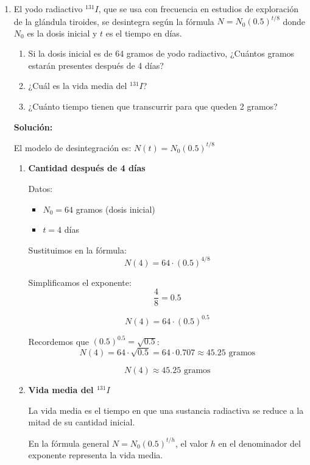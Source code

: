 \documentclass[12pt]{article}
\begin{document}
\begin{enumerate}[label=\alph*.-]
    \newpage
    
    \item El yodo radiactivo $^{131}I$, que se usa con frecuencia en estudios de exploración de la glándula tiroides, se desintegra según la fórmula $N = N_0(0.5)^{t/8}$ donde $N_0$ es la dosis inicial y $t$ es el tiempo en días.
    \begin{enumerate}[label=\roman*.]
        \item Si la dosis inicial es de 64 gramos de yodo radiactivo, ¿Cuántos gramos estarán presentes después de 4 días?
        \item ¿Cuál es la vida media del $^{131}I$?
        \item ¿Cuánto tiempo tienen que transcurrir para que queden 2 gramos?
    \end{enumerate}
    
    \textbf{Solución:}
    
    El modelo de desintegración es: $N(t) = N_0(0.5)^{t/8}$

    \begin{enumerate}[label=\roman*.]
        \item \textbf{Cantidad después de 4 días}
        
        Datos:
        \begin{itemize}
            \item $N_0 = 64$ gramos (dosis inicial)
            \item $t = 4$ días
        \end{itemize}
        
        Sustituimos en la fórmula:
        \[N(4) = 64 \cdot (0.5)^{4/8}\]
        
        Simplificamos el exponente:
        \[\frac{4}{8} = 0.5\]
        
        \[N(4) = 64 \cdot (0.5)^{0.5}\]
        
        Recordemos que $(0.5)^{0.5} = \sqrt{0.5}$:
        \[N(4) = 64 \cdot \sqrt{0.5} = 64 \cdot 0.707 \approx 45.25 \text{ gramos}\]
        
        \[\boxed{N(4) \approx 45.25 \text{ gramos}}\]
        
        \newpage
        \item \textbf{Vida media del $^{131}I$}
        
        La vida media es el tiempo en que una sustancia radiactiva se reduce a la mitad de su cantidad inicial.
        
        En la fórmula general $N = N_0(0.5)^{t/h}$, el valor $h$ en el denominador del exponente representa la vida media.
        

\end{enumerate}
\end{enumerate}
\end{document}
